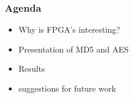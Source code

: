 \begin{frame}
  \frametitle{Agenda}
  \begin{itemize}
    \item Why is FPGA's interesting?
    \item Presentation of MD5 and AES
    \item Results
    \item suggestions for future work
  \end{itemize}
\end{frame}
